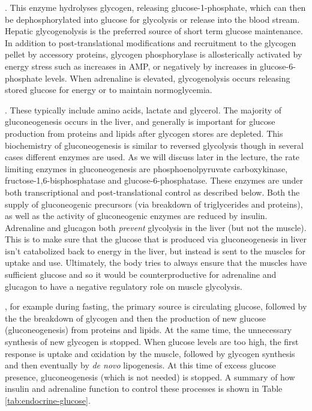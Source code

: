 \documentclass{tufte-handout}
\begin{document}
.  This enzyme hydrolyses glycogen, releasing glucose-1-phosphate, which can then be dephosphorylated into glucose for glycolysis or release into the blood stream.  Hepatic glycogenolysis is the preferred source of short term glucose maintenance.  In addition to post-translational modifications and recruitment to the glycogen pellet by accessory proteins, glycogen phosphorylase is allosterically activated by energy stress such as increases in AMP, or negatively by increases in glucose-6-phosphate levels.  When adrenaline is elevated, glycogenolysis occurs releasing stored glucose for energy or to maintain normoglycemia.

.  These typically include amino acids, lactate and glycerol.  The majority of gluconeogenesis occurs in the liver, and generally is important for glucose production from proteins and lipids after glycogen stores are depleted.  This biochemistry of gluconeogenesis is similar to reversed glycolysis though in several cases different enzymes are used.  As we will discuss later in the lecture, the rate limiting enzymes in gluconeogenesis are phosphoenolpyruvate carboxykinase, fructose-1,6-bisphosphatase and glucose-6-phosphatase.  These enzymes are under both transcriptional and post-translational control as described below.  Both the supply of gluconeogenic precursors (via breakdown of triglycerides and proteins), as well as the activity of gluconeogenic enzymes are reduced by insulin.  Adrenaline and glucagon both \emph{prevent} glycolysis in the liver (but not the muscle).  This is to make sure that the glucose that is produced via gluconeogenesis in liver isn't catabolized back to energy in the liver, but instead is sent to the muscles for uptake and use. Ultimately, the body tries to always ensure that the muscles have sufficient glucose and so it would be counterproductive for adrenaline and glucagon to have a negative regulatory role on muscle glycolysis.

, for example during fasting, the primary source is circulating glucose, followed by the the breakdown of glycogen and then the production of new glucose (gluconeogenesis) from proteins and lipids.  At the same time, the unnecessary synthesis of new glycogen is stopped.  When glucose levels are too high, the first response is uptake and oxidation by the muscle, followed by glycogen synthesis and then eventually by \textit{de novo} lipogenesis.  At this time of excess glucose presence, gluconeogenesis (which is not needed) is stopped.  A summary of how insulin and adrenaline function to control these processes is shown in Table \ref{tab:endocrine-glucose}.
\end{document}
